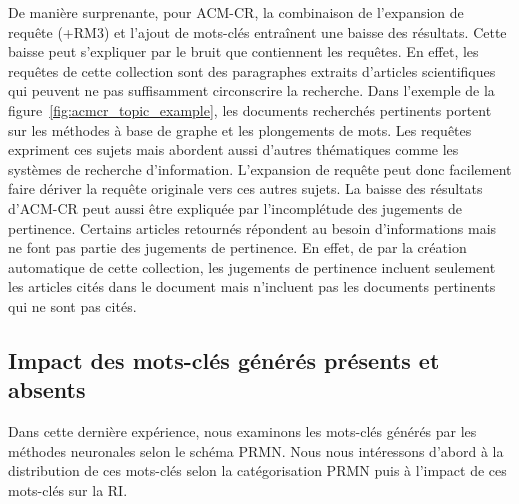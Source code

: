 De manière surprenante, pour ACM-CR, la combinaison de l'expansion de requête (+RM3) et  l'ajout de mots-clés entraînent une baisse des résultats.
Cette baisse peut s'expliquer par le bruit que contiennent les requêtes. %
En effet, les requêtes de cette collection sont des paragraphes extraits d'articles scientifiques qui peuvent ne pas suffisamment circonscrire la recherche. 
Dans l'exemple de la figure~\ref{fig:acmcr_topic_example}, les documents recherchés pertinents portent sur les méthodes à base de graphe et les plongements de mots. Les requêtes expriment ces sujets mais abordent aussi d'autres thématiques comme les systèmes de recherche d'information.
L'expansion de requête peut donc facilement faire dériver la requête originale vers ces autres sujets.
La baisse des résultats d'ACM-CR peut aussi être expliquée par l'incomplétude des jugements de pertinence.
Certains articles retournés répondent au besoin d'informations mais ne font pas partie des jugements de pertinence. En effet, de par la création automatique de cette collection, les jugements de pertinence incluent seulement les articles cités dans le document mais n'incluent pas les documents pertinents qui ne sont pas cités.



\subsection{Impact des mots-clés générés présents et absents}
\label{sec:kg}

Dans cette dernière expérience, nous examinons les mots-clés générés par les méthodes neuronales selon le schéma PRMN.
Nous nous intéressons d'abord à la distribution de ces mots-clés selon la catégorisation PRMN puis à l'impact de ces mots-clés sur la RI.

